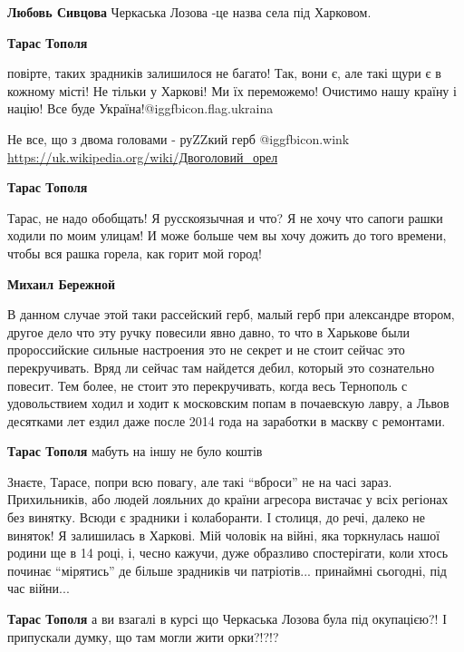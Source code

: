 \begin{itemize}
\begin{itemize}
\textbf{Любовь Сивцова} Черкаська Лозова -це назва села під Харковом.

\textbf{Тарас Тополя} 

повірте, таких зрадників залишилося не багато! Так, вони є, але такі щури є в
кожному місті! Не тільки у Харкові! Ми їх переможемо! Очистимо нашу країну і
націю! Все буде Україна!@igg{fbicon.flag.ukraina}


Не все, що з двома головами - руZZкий герб  @igg{fbicon.wink} 
\url{https://uk.wikipedia.org/wiki/Двоголовий_орел}


\textbf{Тарас Тополя} 

Тарас, не надо обобщать! Я русскоязычная и что? Я не хочу что сапоги рашки
ходили по моим улицам! И може больше чем вы хочу дожить до того времени, чтобы
вся рашка горела, как горит мой город!

\textbf{Михаил Бережной} 

В данном случае этой таки рассейский герб, малый герб при александре втором,
другое дело что эту ручку повесили явно давно, то что в Харькове были
пророссийские сильные настроения это не секрет и не стоит сейчас это
перекручивать. Вряд ли сейчас там найдется дебил, который это сознательно
повесит. Тем более, не стоит это перекручивать, когда весь Тернополь с
удовольствием ходил и ходит к московским попам в почаевскую лавру, а Львов
десятками лет ездил даже после 2014 года на заработки в маскву с ремонтами.

\textbf{Тарас Тополя} мабуть на іншу не було коштів


Знаєте, Тарасе, попри всю повагу, але такі \enquote{вброси} не на часі зараз.
Прихильників, або людей лояльних до країни агресора вистачає у всіх регіонах
без винятку. Всюди є зрадники і колаборанти. І столиця, до речі, далеко не
виняток! Я залишилась в Харкові. Мій чоловік на війні, яка торкнулась нашої
родини ще в 14 році, і, чесно кажучи, дуже образливо спостерігати, коли хтось
починає \enquote{мірятись} де більше зрадників чи патріотів... принаймні сьогодні, під
час війни...

\textbf{Тарас Тополя} а ви взагалі в курсі що Черкаська Лозова була під окупацією?! І припускали думку, що там могли жити орки?!?!?


\end{itemize}
\end{itemize}
